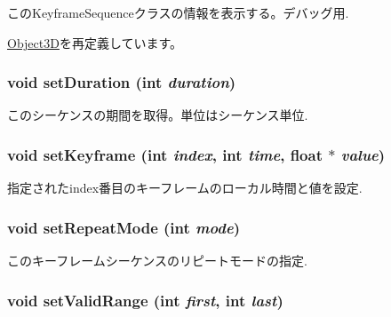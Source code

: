 このKeyframeSequenceクラスの情報を表示する。デバッグ用. 

\hyperlink{classm3g_1_1Object3D_6fea17fa1532df3794f8cb39cb4f911f}{Object3D}を再定義しています。\hypertarget{classm3g_1_1KeyframeSequence_d7406d5e0e2f398e05e3563d099dfdf1}{
\subsubsection[{setDuration}]{\setlength{\rightskip}{0pt plus 5cm}void setDuration (int {\em duration})}}
\label{classm3g_1_1KeyframeSequence_d7406d5e0e2f398e05e3563d099dfdf1}


このシーケンスの期間を取得。単位はシーケンス単位. \hypertarget{classm3g_1_1KeyframeSequence_700d02a4ac28514016721e4b1d2bcf96}{
\subsubsection[{setKeyframe}]{\setlength{\rightskip}{0pt plus 5cm}void setKeyframe (int {\em index}, \/  int {\em time}, \/  float $\ast$ {\em value})}}
\label{classm3g_1_1KeyframeSequence_700d02a4ac28514016721e4b1d2bcf96}


指定されたindex番目のキーフレームのローカル時間と値を設定. \hypertarget{classm3g_1_1KeyframeSequence_e5cd1486fe0a8a61cf96816e976d7f87}{
\subsubsection[{setRepeatMode}]{\setlength{\rightskip}{0pt plus 5cm}void setRepeatMode (int {\em mode})}}
\label{classm3g_1_1KeyframeSequence_e5cd1486fe0a8a61cf96816e976d7f87}


このキーフレームシーケンスのリピートモードの指定. \hypertarget{classm3g_1_1KeyframeSequence_b5a824131cef547816366141afe0339a}{
\subsubsection[{setValidRange}]{\setlength{\rightskip}{0pt plus 5cm}void setValidRange (int {\em first}, \/  int {\em last})}}
\label{classm3g_1_1KeyframeSequence_b5a824131cef547816366141afe0339a}


